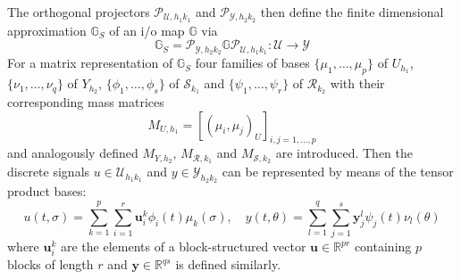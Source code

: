 \documentclass[a4paper,10pt,BCOR=15mm]{scrbook}
\begin{document}
The orthogonal projectors $\mathscr{P} _{\mathcal U ,h_1k_1}$ and $\mathscr{P} _{\mathcal Y ,h_2k_2}$ then define the finite dimensional approximation $\mathbb G _S$ of an i/o map $\mathbb G$ via 
\begin{equation*}
 \mathbb G _S = \mathscr{P} _{\mathcal Y ,h_2k_2} \mathbb G \mathscr{P} _{\mathcal U ,h_1k_1}: \mathcal U \rightarrow \mathcal Y
\end{equation*}
For a matrix representation of $\mathbb G_S$ four families of bases $\{ \mu_1, \dotsc , \mu_p \}$ of $U_{h_1}$, $\{ \nu_1, \dotsc , \nu_q \}$ of $Y_{h_2}$, $\{ \phi_1, \dotsc , \phi_s \}$ of $\mathcal S_{k_1}$ and $\{ \psi_1, \dotsc , \psi_r \}$ of $\mathcal R_{k_2}$ with their corresponding mass matrices 
\begin{equation*}
 M_{U,h_1} = \left[ (\mu_i,\mu_j) _U \right]_{i,j=1,\dotsc,p} 
\end{equation*}
 and analogously defined $M_{Y,h_2}$, $M_{\mathcal R,k_1}$ and $M_{\mathcal S,k_2}$ are introduced. Then the discrete signals $u \in \mathcal U _{h_1k_1}$ and $y \in \mathcal Y _{h_2k_2}$ can be represented by means of the tensor product bases:
\begin{equation}\label{tepro}
 u(t,\sigma) = \sum_{k=1}^p \sum_{i=1}^r \mathbf u _i ^k \phi_i(t) \mu_k(\sigma), \quad y(t,\theta) = \sum_{l=1}^q \sum_{j=1}^s \mathbf y _j ^l \psi_j(t) \nu_l(\theta)
\end{equation}
where $\mathbf u _i ^k$ are the elements of a block-structured vector $\mathbf u \in \mathbb R ^ {pr}$ containing $p$ blocks of length $r$ and $\mathbf y \in \mathbb R ^ {qs}$ is defined similarly. 
\end{document}
